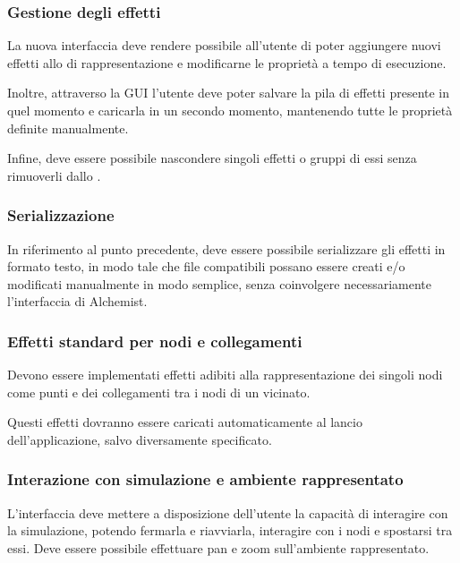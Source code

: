             \subsubsection{Gestione degli effetti}\label{subusubsec:manageEffects}
                La nuova interfaccia deve rendere possibile all'utente di poter aggiungere nuovi effetti allo  di rappresentazione e modificarne le proprietà a tempo di esecuzione.

                Inoltre, attraverso la GUI l'utente deve poter salvare la pila di effetti presente in quel momento e caricarla in un secondo momento, mantenendo tutte le proprietà definite manualmente.

                Infine, deve essere possibile nascondere singoli effetti o gruppi di essi senza rimuoverli dallo .

            \subsubsection{Serializzazione }
                In riferimento al punto precedente, deve essere possibile serializzare gli effetti in formato testo, in modo tale che file compatibili possano essere creati e/o modificati manualmente in modo semplice, senza coinvolgere necessariamente l'interfaccia di Alchemist.

            \subsubsection{Effetti standard per nodi e collegamenti}\label{subusubsec:defaultEffects}
                Devono essere implementati effetti adibiti alla rappresentazione dei singoli nodi come punti e dei collegamenti tra i nodi di un vicinato.

                Questi effetti dovranno essere caricati automaticamente al lancio dell'applicazione, salvo diversamente specificato.

            \subsubsection{Interazione con simulazione e ambiente rappresentato}\label{subsubsec:interazione}
                L'interfaccia deve mettere a disposizione dell'utente la capacità di interagire con la simulazione, potendo fermarla e riavviarla, interagire con i nodi e spostarsi tra essi.
                Deve essere possibile effettuare pan e zoom sull'ambiente rappresentato.

